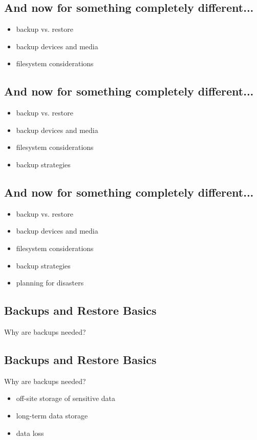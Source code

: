 \documentclass[xga]{xdvislides}
\begin{document}
\subsection{And now for something completely different...}
\begin{itemize}
	\item backup vs. restore
	\item backup devices and media
	\item filesystem considerations
\end{itemize}

\subsection{And now for something completely different...}
\begin{itemize}
	\item backup vs. restore
	\item backup devices and media
	\item filesystem considerations
	\item backup strategies
\end{itemize}

\subsection{And now for something completely different...}
\begin{itemize}
	\item backup vs. restore
	\item backup devices and media
	\item filesystem considerations
	\item backup strategies
	\item planning for disasters
\end{itemize}

\subsection{Backups and Restore Basics}
Why are backups needed?

\subsection{Backups and Restore Basics}
Why are backups needed?
\begin{itemize}
	\item off-site storage of sensitive data
	\item long-term data storage
	\item data loss
\end{itemize}
\end{document}
